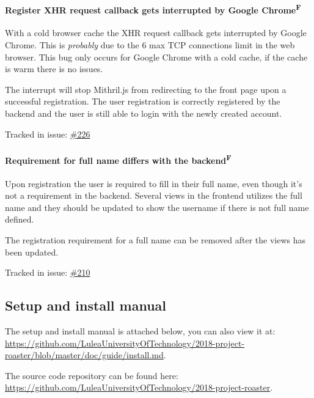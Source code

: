 \documentclass[12pt,a4paper]{report}
\begin{document}
\subsubsection{Register XHR request callback gets interrupted by Google  Chrome\texorpdfstring{\textsuperscript{F}}{}}
With a cold browser cache the XHR request callback gets interrupted by Google Chrome. This is \textit{probably} due to the 6 max TCP connections limit in the web browser. This bug only occurs for Google Chrome with a cold cache, if the cache is warm there is no issues.

The interrupt will stop Mithril.js from redirecting to the front page upon a successful registration. The user registration is correctly registered by the backend and the user is still able to login with the newly created account.

Tracked in issue: \href{https://github.com/LuleaUniversityOfTechnology/2018-project-roaster/issues/226}{\#226}

\subsubsection{Requirement for full name differs with the backend\texorpdfstring{\textsuperscript{F}}{}}
Upon registration the user is required to fill in their full name, even though it's not a requirement in the backend. Several views in the frontend utilizes the full name and they should be updated to show the username if there is not full name defined.

The registration requirement for a full name can be removed after the views has been updated.

Tracked in issue: \href{https://github.com/LuleaUniversityOfTechnology/2018-project-roaster/issues/210}{\#210}

\newpage
\apptocmd{\sloppy}{\hbadness 10000\relax}{}{}



\begin{appendix}
    \chapter{Setup and install manual}
    The setup and install manual is attached below, you can also view it at: \\ \url{https://github.com/LuleaUniversityOfTechnology/2018-project-roaster/blob/master/doc/guide/install.md}.

    The source code repository can be found here: \\ \url{https://github.com/LuleaUniversityOfTechnology/2018-project-roaster}.

    
\end{appendix}
\end{document}
